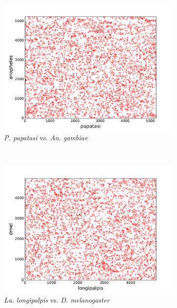 \begin{figure}[H]
\begin{subfigure}[b]{0.45\textwidth}
  \end{subfigure}
  ~
  \begin{subfigure}[b]{0.45\textwidth}
    \includegraphics[width=\textwidth]{figures/synteny/papatasi_anopheles_plot}
    \caption{\emph{P. papatasi} vs. \emph{An. gambiae}}
    \label{fig:synteny-dotplots-papatasi-anopheles}
  \end{subfigure}
  ~
  \begin{subfigure}[b]{0.45\textwidth}
    \includegraphics[width=\textwidth]{figures/synteny/longipalpis_dmel_plot}
    \caption{\emph{Lu. longipalpis} vs. \emph{D. melanogaster}}
    \label{fig:synteny-dotplots-longipalpis-dmel}
  \end{subfigure}
  ~
  \begin{subfigure}[b]{0.45\textwidth}

\end{subfigure}
\end{figure}

